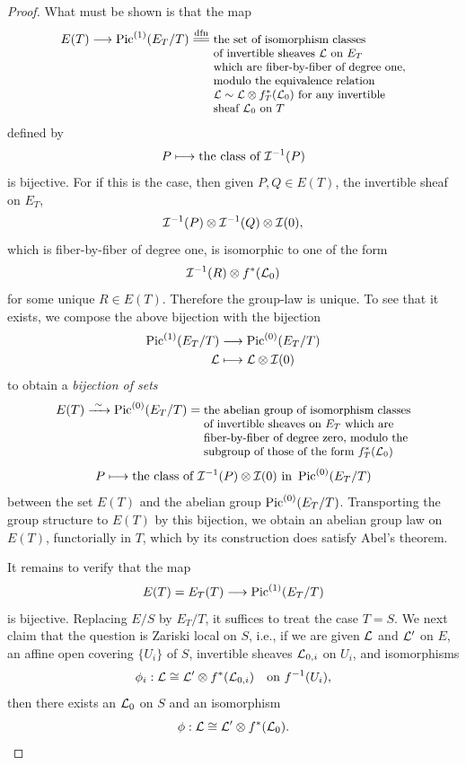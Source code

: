 \begin{proof}
What must be shown is that the map
\[
{\small E(T) \longrightarrow \Pic^{(1)}(E_T/T) \xlongequal{dfn} \begin{array}[t]{@{}l@{}}
\text{the set of isomorphism classes} \\
\text{of invertible sheaves } \cL \text{ on } E_T \\
\text{which are fiber-by-fiber of degree one,} \\
\text{modulo the equivalence relation} \\
\cL \sim \cL \otimes f_T^*(\cL_0) \text{ for any invertible} \\
\text{sheaf } \cL_0 \text{ on } T
\end{array}}
\]
defined by
\[
P \longmapsto \text{the class of } \mathcal{I}^{-1}(P)
\]
is bijective. For if this is the case, then given $P, Q \in E(T)$, the invertible sheaf on $E_T$,
\[
\mathcal{I}^{-1}(P) \otimes \mathcal{I}^{-1}(Q) \otimes \mathcal{I}(0),
\]
which is fiber-by-fiber of degree one, is isomorphic to one of the form
\[
\mathcal{I}^{-1}(R) \otimes f^*(\mathcal{L}_0)
\]
for some unique $R \in E(T)$. Therefore the group-law is unique. To see that it exists, we compose the above bijection with the bijection
\[
\begin{aligned}
\operatorname{Pic}^{(1)}(E_T/T) &\longrightarrow \operatorname{Pic}^{(0)}(E_T/T) \\
\mathcal{L} &\longmapsto \mathcal{L} \otimes \mathcal{I}(0)
\end{aligned}
\]
to obtain a \emph{bijection of sets}
\[
{\small E(T) \xrightarrow{\ \sim\ } \Pic^{(0)}(E_T/T) = \begin{array}[t]{@{}l@{}}
\text{the abelian group of isomorphism classes} \\
\text{of invertible sheaves on } E_T \text{ which are} \\
\text{fiber-by-fiber of degree zero, modulo the} \\
\text{subgroup of those of the form } f_T^*(\cL_0)
\end{array}}
\]
\[
P \longmapsto \text{the class of } \mathcal{I}^{-1}(P) \otimes \mathcal{I}(0) \text{ in } \operatorname{Pic}^{(0)}(E_T/T)
\]
between the set $E(T)$ and the abelian group $\operatorname{Pic}^{(0)}(E_T/T)$. Transporting the group structure to $E(T)$ by this bijection, we obtain an abelian group law on $E(T)$, functorially in $T$, which by its construction does satisfy Abel's theorem.

It remains to verify that the map
\[
E(T) = E_T(T) \longrightarrow \operatorname{Pic}^{(1)}(E_T/T)
\]
is bijective. Replacing $E/S$ by $E_T/T$, it suffices to treat the case $T = S$. We next claim that the question is Zariski local on $S$, i.e., if we are given $\mathcal{L}$ and $\mathcal{L}'$ on $E$, an affine open covering $\{U_i\}$ of $S$, invertible sheaves $\mathcal{L}_{0,i}$ on $U_i$, and isomorphisms
\[
\phi_i : \mathcal{L} \cong \mathcal{L}' \otimes f^*(\mathcal{L}_{0,i}) \quad \text{on } f^{-1}(U_i),
\]
then there exists an $\mathcal{L}_0$ on $S$ and an isomorphism
\[
\phi : \mathcal{L} \cong \mathcal{L}' \otimes f^*(\mathcal{L}_0).
\]


\end{proof}
